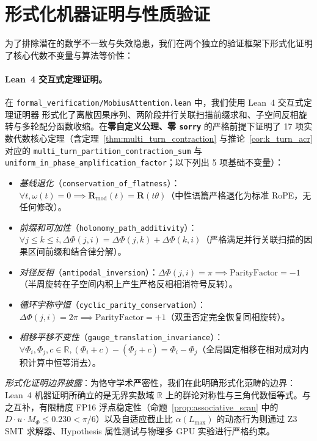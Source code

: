 \documentclass[11pt,a4paper]{article}
\theoremstyle{definition}
\begin{document}
\section{形式化机器证明与性质验证}
为了排除潜在的数学不一致与失效隐患，我们在两个独立的验证框架下形式化证明了核心代数不变量与算法等价性：

\paragraph{Lean~4 交互式定理证明。}
在 \texttt{formal\_verification/MobiusAttention.lean} 中，我们使用 Lean~4 交互式定理证明器 \cite{moura2021lean} 形式化了离散因果序列、两阶段并行关联扫描前缀求和、子空间反相旋转与多轮配分函数收缩。在\textbf{零自定义公理、零 \texttt{sorry}} 的严格前提下证明了 17 项实数代数核心定理（含定理~\ref{thm:multi_turn_contraction} 与推论~\ref{cor:k_turn_acr} 对应的 \texttt{multi\_turn\_partition\_contraction\_sum} 与 \texttt{uniform\_in\_phase\_amplification\_factor}；以下列出 5 项基础不变量）：
\begin{itemize}
    \item \emph{基线退化}（\texttt{conservation\_of\_flatness}）：$\forall t, \omega(t) = 0 \implies \mathbf{R}_{\text{mod}}(t) = \mathbf{R}(t\theta)$（中性语篇严格退化为标准 RoPE，无任何修改）。
    \item \emph{前缀和可加性}（\texttt{holonomy\_path\_additivity}）：$\forall j \le k \le i, \Delta\Phi(j, i) = \Delta\Phi(j, k) + \Delta\Phi(k, i)$（严格满足并行关联扫描的因果区间前缀和结合律分解）。
    \item \emph{对径反相}（\texttt{antipodal\_inversion}）：$\Delta\Phi(j, i) = \pi \implies \mathrm{ParityFactor} = -1$（半周旋转在子空间内积上产生严格反相相消符号反转）。
    \item \emph{循环宇称守恒}（\texttt{cyclic\_parity\_conservation}）：$\Delta\Phi(j, i) = 2\pi \implies \mathrm{ParityFactor} = +1$（双重否定完全恢复同相旋转）。
    \item \emph{相移平移不变性}（\texttt{gauge\_translation\_invariance}）：$\forall \Phi_i, \Phi_j, c \in \mathbb{R}, (\Phi_i + c) - (\Phi_j + c) = \Phi_i - \Phi_j$（全局固定相移在相对成对内积计算中恒等消去）。
\end{itemize}
\emph{形式化证明边界披露}：为恪守学术严密性，我们在此明确形式化范畴的边界：Lean~4 机器证明所确立的是无界实数域 $\mathbb{R}$ 上的群论对称性与三角代数恒等式。与之互补，有限精度 FP16 浮点稳定性（命题~\ref{prop:associative_scan} 中的 $D \cdot u \cdot M_\Phi \le 0.230 < \pi/6$）以及自适应截止比 $\alpha(L_{\max})$ 的动态行为则通过 Z3 SMT 求解器、Hypothesis 属性测试与物理多 GPU 实验进行严格约束。
\end{document}
